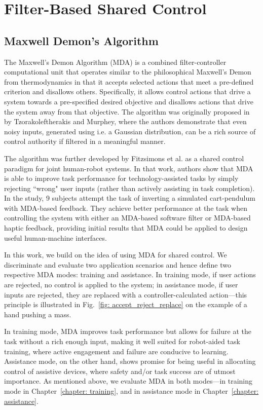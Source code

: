 

\section{Filter-Based Shared Control}

\subsection{Maxwell Demon's Algorithm}

The Maxwell's Demon Algorithm (MDA) is a combined filter-controller computational unit that operates similar to the philosophical Maxwell's Demon from thermodynamics in that it accepts selected actions that meet a pre-defined criterion and disallows others. Specifically, it allows control actions that drive a system towards a pre-specified desired objective and disallows actions that drive the system away from that objective. The algorithm was originally proposed in \cite{MDA_Emmanouil} by Tzorakoleftherakis and Murphey, where the authors demonstrate that even noisy inputs, generated using i.e. a Gaussian distribution, can be a rich source of control authority if filtered in a meaningful manner. 

The algorithm was further developed by Fitzsimons et al. \cite{MDA_Katie} as a shared control paradigm for joint human-robot systems. In that work, authors show that MDA is able to improve task performance for technology-assisted tasks by simply rejecting ``wrong" user inputs (rather than actively assisting in task completion). In the study, 9 subjects attempt the task of inverting a simulated cart-pendulum with MDA-based feedback. They achieve better performance at the task when controlling the system with either an MDA-based software filter or MDA-based haptic feedback, providing initial results that MDA could be applied to design useful human-machine interfaces. 

In this work, we build on the idea of using MDA for shared control. We discriminate and evaluate two application scenarios and hence define two respective MDA modes: training and assistance. In training mode, if user actions are rejected, no control is applied to the system; in assistance mode, if user inputs are rejected, they are replaced with a controller-calculated action---this principle is illustrated in Fig.~\ref{fig: accept_reject_replace} on the example of a hand pushing a mass. 

In training mode, MDA improves task performance but allows for failure at the task without a rich enough input, making it well suited for robot-aided task training, where active engagement and failure are conducive to learning. Assistance mode, on the other hand, shows promise for being useful in allocating control of assistive devices, where safety and/or task success are of utmost importance. As mentioned above, we evaluate MDA in both modes---in training mode in Chapter~\ref{chapter: training}, and in assistance mode in Chapter~\ref{chapter: assistance}. 

